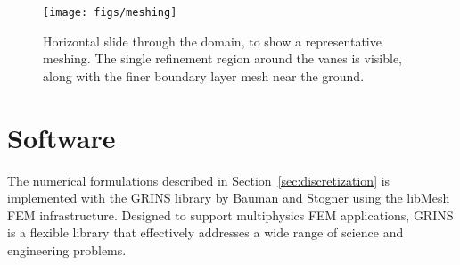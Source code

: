   \begin{figure}[!htb]
    \begin{center}
     \texttt{[image: figs/meshing]}
     \caption{Horizontal slide through the domain, to show a
     representative meshing. The single refinement region around the
     vanes is visible, along with the finer boundary layer mesh near the
     ground.}
     \label{fig:meshing}
    \end{center}
  \end{figure}





\section{Software}

The numerical formulations described in Section~\ref{sec:discretization}
is implemented with the GRINS library\cite{GRINSpaper} by Bauman
and Stogner using the libMesh\cite{libMeshPaper} FEM
infrastructure. Designed to support multiphysics FEM applications, 
GRINS is a flexible library that effectively addresses a wide range of 
science and engineering problems.   
 


